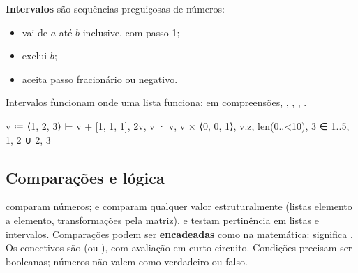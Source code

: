 \textbf{Intervalos} são sequências preguiçosas de números:
\begin{itemize}
  \item {} vai de $a$ até $b$ inclusive, com passo 1;
  \item {} exclui $b$;
  \item {} aceita passo fracionário ou negativo.
\end{itemize}
Intervalos funcionam onde uma lista funciona: em compreensões, , , , .
\begin{csg}[run]
v ≔ ⟨1, 2, 3⟩
⊢ v + [1, 1, 1], 2v, v · v, v × ⟨0, 0, 1⟩, v.z, len(0..<10), 3 ∈ 1..5, {1, 2} ∪ {2, 3}
\end{csg}

\subsection{Comparações e lógica}
 comparam números; \code{=} e  comparam qualquer valor estruturalmente (listas
elemento a elemento, transformações pela matriz).  e  testam pertinência em listas e intervalos.
Comparações podem ser \textbf{encadeadas} como na matemática:  significa .
Os conectivos são  (ou ), com avaliação em curto-circuito. Condições precisam ser booleanas;
números não valem como verdadeiro ou falso.

